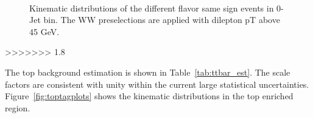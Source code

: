 \begin{figure}[!hbtp]
{}
\\

\caption{Kinematic distributions of the different flavor same sign events in 0-Jet bin. 
The WW preselections are applied with dilepton pT above 45 GeV. }
\label{fig:ssplots}
\end{figure}
>>>>>>> 1.8

The top background estimation is shown in Table~\ref{tab:ttbar_est}. 
The scale factors are consistent with unity within 
the current large statistical uncertainties. 
Figure~\ref{fig:toptagplots} shows the kinematic distributions in the top enriched 
region. 


